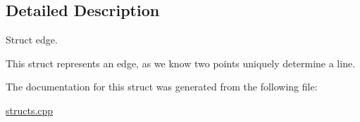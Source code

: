 \subsection{Detailed Description}
Struct edge. 

This struct represents an edge, as we know two points uniquely determine a line. 

The documentation for this struct was generated from the following file\+:\begin{DoxyCompactItemize}
\item 
\hyperlink{structs_8cpp}{structs.\+cpp}\end{DoxyCompactItemize}
